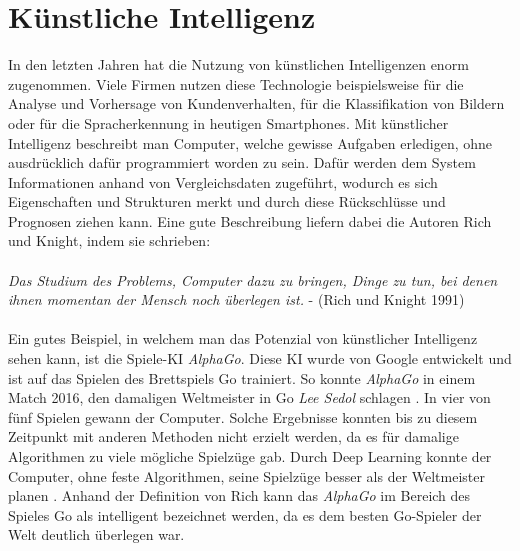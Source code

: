 \section{Künstliche Intelligenz}\label{s.ki}
In den letzten Jahren hat die Nutzung von künstlichen Intelligenzen enorm zugenommen. Viele Firmen nutzen diese Technologie beispielsweise für die Analyse und Vorhersage von Kundenverhalten, für die Klassifikation von Bildern oder für die Spracherkennung in heutigen Smartphones. Mit künstlicher Intelligenz beschreibt man Computer, welche gewisse Aufgaben erledigen, ohne ausdrücklich dafür programmiert worden zu sein. Dafür werden dem System Informationen anhand von Vergleichsdaten zugeführt, wodurch es sich Eigenschaften und Strukturen merkt und durch diese Rückschlüsse und Prognosen ziehen kann. Eine gute Beschreibung liefern dabei die Autoren Rich und Knight, indem sie schrieben:\\\\
 \textit{Das Studium des Problems, Computer dazu zu bringen, Dinge zu tun, bei denen ihnen momentan der Mensch noch überlegen ist.} - (Rich und Knight 1991) \cite[231]{kuppers2017humanoide}\\\\
Ein gutes Beispiel, in welchem man das Potenzial von künstlicher Intelligenz sehen kann, ist die Spiele-KI  \textit{AlphaGo}. Diese KI wurde von Google entwickelt und ist auf das Spielen des Brettspiels Go trainiert. So konnte \textit{AlphaGo} in einem Match 2016, den damaligen Weltmeister in Go \textit{Lee Sedol} schlagen \cite{Alpha2016GO}. In vier von fünf Spielen gewann der Computer. Solche Ergebnisse konnten bis zu diesem Zeitpunkt mit anderen Methoden nicht erzielt werden, da es für damalige Algorithmen zu viele mögliche Spielzüge gab. Durch Deep Learning konnte der Computer, ohne feste Algorithmen, seine Spielzüge besser als der Weltmeister planen \cite[331 ff.]{ertel2013grundkurs}. Anhand der Definition von Rich kann das  \textit{AlphaGo}  im Bereich des Spieles Go als intelligent bezeichnet werden, da es dem besten Go-Spieler der Welt deutlich überlegen war.
